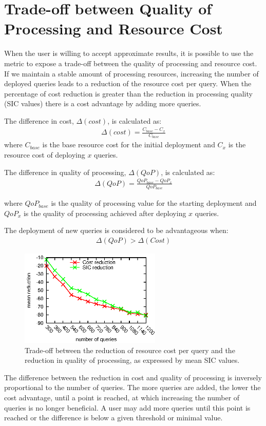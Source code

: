 \section{Trade-off between Quality of Processing and Resource Cost}
\label{sec:cost}
When the user is willing to accept approximate results, it is possible to use the \sic metric to expose
a trade-off between the quality of processing and resource cost. 
If we maintain a stable amount of processing resources, increasing the number of deployed queries
leads to a reduction of the resource cost per query. 
When the percentage of cost reduction is greater than the reduction in processing quality (\ie SIC
values) there is a cost advantage by adding more queries. 

The difference in cost, $\Delta(cost)$, is calculated as:
\begin{align}
	\Delta(cost) = \frac{C_{base}-C_x}{C_{base}}
\end{align}
where $C_{base}$ is the base resource cost for the initial deployment and $C_x$ is the resource cost of
deploying $x$ queries.

The difference in quality of processing, $\Delta(QoP)$, is calculated as:
\begin{align}
	\Delta(QoP) = \frac{QoP_{base}-QoP_x}{QoP_{base}}
\end{align}

where $QoP_{base}$ is the quality of processing value for the starting deployment and $QoP_x$ is the
quality of processing achieved after deploying $x$ queries.

The deployment of new queries is considered to be advantageous when:
\begin{align}
	\Delta(QoP)>\Delta(Cost)
\end{align}
\begin{figure} 
\centering 
\includegraphics[width=0.6\textwidth]{img/tesi/cost2}  
\caption{Trade-off between the reduction of resource cost per query and the reduction in quality of
processing, as expressed by mean SIC values.}
\label{fig:tradeoff-mean}
\end{figure}
The difference between the reduction in cost and quality of processing is inversely proportional to the
number of queries. The more queries are added, the lower the cost advantage, until a point is reached,
at which increasing the number of queries is no longer beneficial.
A user may add more queries until this point is reached or the difference is below a given threshold or
minimal \sic value.

